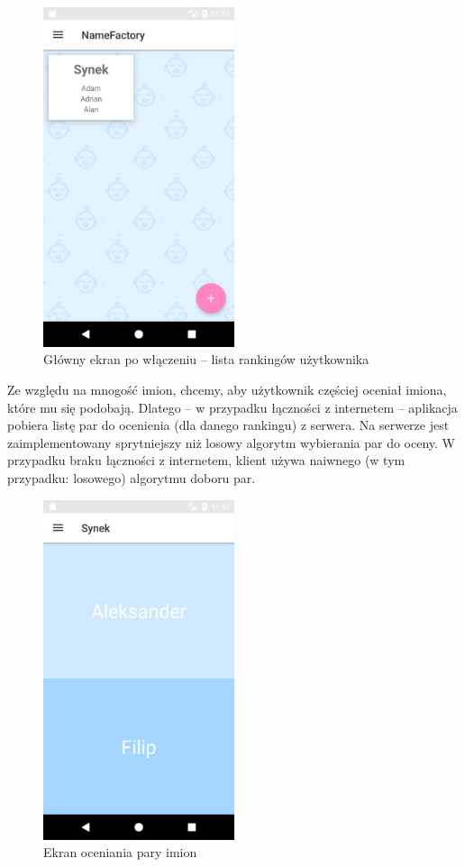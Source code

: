 \documentclass[12pt,a4paper]{article}
\begin{document}
\begin{figure}[h]
    \caption{Główny ekran po włączeniu -- lista rankingów użytkownika}
    \centering
    \includegraphics[width=0.5\textwidth]{rankings}
\end{figure}

Ze względu na mnogość imion, chcemy, aby użytkownik częściej oceniał imiona, które mu się podobają.
Dlatego -- w przypadku łączności z internetem -- aplikacja pobiera listę par do ocenienia (dla danego rankingu) z serwera.
Na serwerze jest zaimplementowany sprytniejszy niż losowy algorytm wybierania par do oceny.
W przypadku braku łączności z internetem, klient używa naiwnego (w tym przypadku: losowego) algorytmu doboru par.

\begin{figure}[h]
    \caption{Ekran oceniania pary imion}
    \centering
    \includegraphics[width=0.5\textwidth]{match}
\end{figure}
\end{document}

